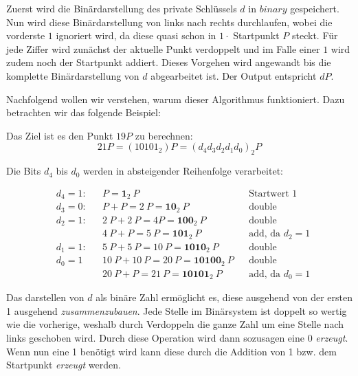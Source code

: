 Zuerst wird die Binärdarstellung des private Schlüssels $d$ in $binary$ gespeichert. Nun wird diese Binärdarstellung von links nach rechts durchlaufen, wobei die vorderste $1$ ignoriert wird, da diese quasi schon in $1 \cdot$ Startpunkt $P$ steckt. Für jede Ziffer wird zunächst der aktuelle Punkt verdoppelt und im Falle einer $1$ wird zudem noch der Startpunkt addiert. Dieses Vorgehen wird angewandt bis die komplette Binärdarstellung von $d$ abgearbeitet ist. Der Output entspricht $dP$.

Nachfolgend wollen wir verstehen, warum dieser Algorithmus funktioniert. Dazu betrachten wir das folgende Beispiel:

Das Ziel ist es den Punkt $19	 P$ zu berechnen:
$$21P = (10101_2)P = (d_4 d_3 d_2 d_1 d_0)_2 P$$

Die Bits $d_4$ bis $d_0$ werden in absteigender Reihenfolge verarbeitet:

\begin{align*}
&d_4 = 1:	&&P = \boldsymbol{1}_2\ P  							&&\text{Startwert 1}\\
&d_3 = 0: 	&&P + P = 2\ P = \boldsymbol{10}_2\ P 				&&\text{double}\\
&d_2 = 1: 	&&2\ P + 2\ P = 4 P = \boldsymbol{100}_2\ P 			&&\text{double}\\
&			&&4\ P + P = 5\ P = \boldsymbol{101}_2\ P 			&&\text{add, da $d_2 = 1$}\\
&d_1 = 1: 	&&5\ P + 5\ P = 10\ P = \boldsymbol{1010}_2\ P 		&&\text{double}\\
&d_0 = 1  	&&10\ P + 10\ P = 20\ P = \boldsymbol{10100}_2\ P 	&&\text{double}\\
&			&&20\ P + P = 21\ P = \boldsymbol{10101}_2\ P 		&&\text{add, da $d_0 = 1$}
\end{align*}

Das darstellen von $d$ als binäre Zahl ermöglicht es, diese ausgehend von der ersten 1 ausgehend \textit{zusammenzubauen}. Jede Stelle im Binärsystem ist doppelt so wertig wie die vorherige, weshalb durch Verdoppeln die ganze Zahl um eine Stelle nach links geschoben wird. Durch diese Operation wird dann sozusagen eine 0 \textit{erzeugt}. Wenn nun eine 1 benötigt wird kann diese durch die Addition von 1 bzw. dem Startpunkt \textit{erzeugt} werden.\\


